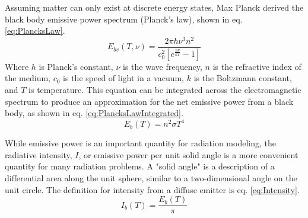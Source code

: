 Assuming matter can only exist at discrete energy states, Max Planck derived the black body emissive power spectrum (Planck's law), shown in eq. \ref{eq:PlancksLaw}.
\begin{equation}
    E_{bv}(T,\nu{}) = \frac{2\pi{}h\nu{}^3n^2}{c_0^2\left[e^\frac{h\nu{}}{kT}-1\right]}
    \label{eq:PlancksLaw}
\end{equation}
Where $h$ is Planck's constant, $\nu{}$ is the wave frequency, $n$ is the refractive index of the medium, $c_0$ is the speed of light in a vacuum, $k$ is the Boltzmann constant, and $T$ is temperature. This equation can be integrated across the electromagnetic spectrum to produce an approximation for the net emissive power from a black body, as shown in eq. \ref{eq:PlancksLawIntegrated}.
\begin{equation}
    E_b(T) = n^2\sigma{}T^4
    \label{eq:PlancksLawIntegrated}
\end{equation}

While emissive power is an important quantity for radiation modeling, the radiative intensity, $I$, or emissive power per unit solid angle is a more convenient quantity for many radiation problems. A "solid angle" is a description of a differential area along the unit sphere, similar to a two-dimensional angle on the unit circle. The definition for intensity from a diffuse emitter is eq. \ref{eq:Intensity}.
\begin{equation}
    I_b(T) = \frac{E_b(T)}{\pi}
    \label{eq:Intensity}
\end{equation}


